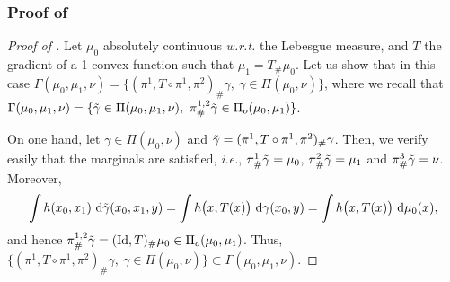 \documentclass[twoside]{article}
\newcommand{\id}{\mathrm{Id}}
\begin{document}
\subsubsection{Proof of } \label{proof:corollary_busemann_ot_map}

\begin{proof}[Proof of ]
    Let $\mu_0$ absolutely continuous \emph{w.r.t.} the Lebesgue measure, and $T$ the gradient of a 1-convex function such that $\mu_1=T_\#\mu_0$. Let us show that in this case $\Gamma(\mu_0,\mu_1,\nu)=\{(\pi^1, T\circ \pi^1, \pi^2)_\#\gamma,\ \gamma\in\Pi(\mu_0,\nu)\}$, where we recall that $\Gamma(\mu_0,\mu_1,\nu)=\{\Tilde{\gamma}\in\Pi(\mu_0,\mu_1,\nu),\ \pi^{1,2}_\#\Tilde{\gamma}\in\Pi_o(\mu_0,\mu_1)\}$.

    On one hand, let $\gamma\in\Pi(\mu_0,\nu)$ and $\Tilde{\gamma} = (\pi^1, T\circ\pi^1, \pi^2)_\#\gamma$. Then, we verify easily that the marginals are satisfied, \emph{i.e.}, $\pi^1_\#\Tilde{\gamma}=\mu_0$, $\pi^2_\#\Tilde{\gamma}=\mu_1$ and $\pi^3_\#\Tilde{\gamma}=\nu$. Moreover,
    \begin{equation}
        \int h(x_0,x_1)\ \mathrm{d}\Tilde{\gamma}(x_0,x_1,y) = \int h\big(x,T(x)\big)\ \mathrm{d}\gamma(x_0,y) = \int h\big(x,T(x)\big)\ \mathrm{d}\mu_0(x),
    \end{equation}
    and hence $\pi^{1,2}_\#\Tilde{\gamma}=(\id,T)_\#\mu_0\in\Pi_o(\mu_0,\mu_1)$. Thus, $\{(\pi^1, T\circ \pi^1, \pi^2)_\#\gamma,\ \gamma\in\Pi(\mu_0,\nu)\} \subset \Gamma(\mu_0,\mu_1,\nu)$.


\end{proof}
\end{document}
